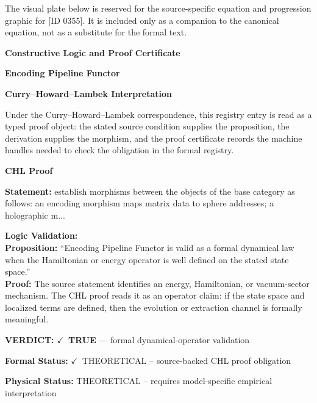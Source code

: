\begingroup\footnotesize\sloppy
The visual plate below is reserved for the source-specific equation and progression graphic for [ID 0355]. It is included only as a companion to the canonical equation, not as a substitute for the formal text.
\par\endgroup
\ifTZPDarkEdition
{}
\fi

\clearpage
\begingroup\tzpsupportsetup
\noindent\textbf{\fontsize{10.8pt}{12.8pt}\selectfont [ID 0355] Constructive Logic and Proof Certificate}\par
\noindent\textbf{\fontsize{10pt}{12pt}\selectfont Encoding Pipeline Functor}\par
\vspace{0.45em}
\begingroup
\footnotesize
\setlength{\parskip}{0.22em}
\setlength{\parindent}{0pt}
\noindent\textbf{Curry--Howard--Lambek Interpretation}\par
Under the Curry--Howard--Lambek correspondence, this registry entry is read as a typed proof
object: the stated source condition supplies the proposition, the derivation supplies the
morphism, and the proof certificate records the machine handles needed to check the obligation
in the formal registry.

\vspace{0.45em}
\noindent\textbf{CHL Proof}\par
\textbf{Statement:} establish morphisms between the objects of the base category as follows: an encoding
morphism maps matrix data to sphere addresses; a holographic m...

\textbf{Logic Validation:}\\
\textbf{Proposition:} ``Encoding Pipeline Functor is valid as a formal dynamical law when the Hamiltonian or
energy operator is well defined on the stated state space.''\\
\textbf{Proof:} The source statement identifies an energy, Hamiltonian, or vacuum-sector mechanism. The
CHL proof reads it as an operator claim: if the state space and localized terms are
defined, then the evolution or extraction channel is formally meaningful.

\textbf{VERDICT:} \ensuremath{\checkmark}\ \textbf{TRUE} --- formal dynamical-operator validation

\textbf{Formal Status:} \ensuremath{\checkmark}\ THEORETICAL -- source-backed CHL proof obligation

\textbf{Physical Status:} THEORETICAL -- requires model-specific empirical interpretation
\par\vspace{0.45em}
\par
\ifTZPDarkEdition
{}
\fi
\endgroup
\endgroup
